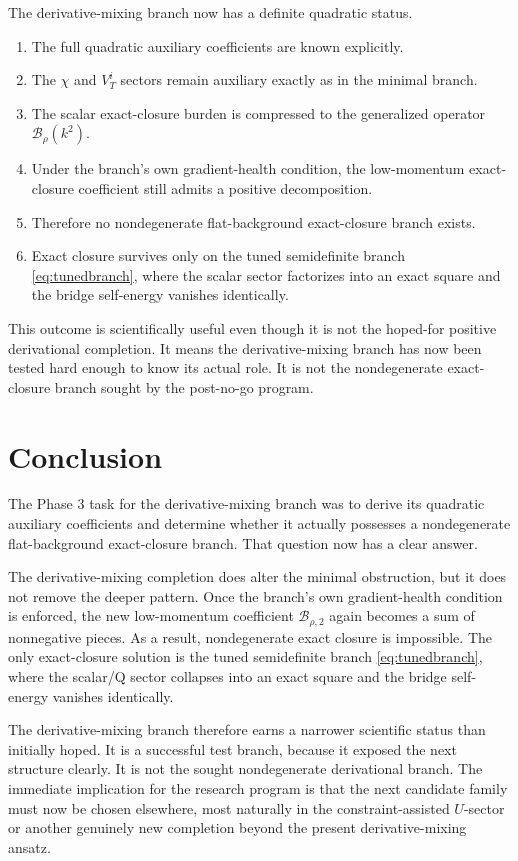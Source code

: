 \documentclass[11pt]{article}
\begin{document}
The derivative-mixing branch now has a definite quadratic status.
\begin{enumerate}
    \item The full quadratic auxiliary coefficients are known explicitly.
    \item The \(\chi\) and \(V_T^i\) sectors remain auxiliary exactly as in the minimal branch.
    \item The scalar exact-closure burden is compressed to the generalized operator \(\mathcal B_{\rho}(k^2)\).
    \item Under the branch's own gradient-health condition, the low-momentum exact-closure coefficient still admits a positive decomposition.
    \item Therefore no nondegenerate flat-background exact-closure branch exists.
    \item Exact closure survives only on the tuned semidefinite branch \eqref{eq:tunedbranch}, where the scalar sector factorizes into an exact square and the bridge self-energy vanishes identically.
\end{enumerate}

This outcome is scientifically useful even though it is not the hoped-for positive derivational completion. It means the derivative-mixing branch has now been tested hard enough to know its actual role. It is not the nondegenerate exact-closure branch sought by the post-no-go program.

\section{Conclusion}

The Phase 3 task for the derivative-mixing branch was to derive its quadratic auxiliary coefficients and determine whether it actually possesses a nondegenerate flat-background exact-closure branch. That question now has a clear answer.

The derivative-mixing completion does alter the minimal obstruction, but it does not remove the deeper pattern. Once the branch's own gradient-health condition is enforced, the new low-momentum coefficient \(\mathcal B_{\rho,2}\) again becomes a sum of nonnegative pieces. As a result, nondegenerate exact closure is impossible. The only exact-closure solution is the tuned semidefinite branch \eqref{eq:tunedbranch}, where the scalar/Q sector collapses into an exact square and the bridge self-energy vanishes identically.

The derivative-mixing branch therefore earns a narrower scientific status than initially hoped. It is a successful test branch, because it exposed the next structure clearly. It is not the sought nondegenerate derivational branch. The immediate implication for the research program is that the next candidate family must now be chosen elsewhere, most naturally in the constraint-assisted \(U\)-sector or another genuinely new completion beyond the present derivative-mixing ansatz.
\end{document}

